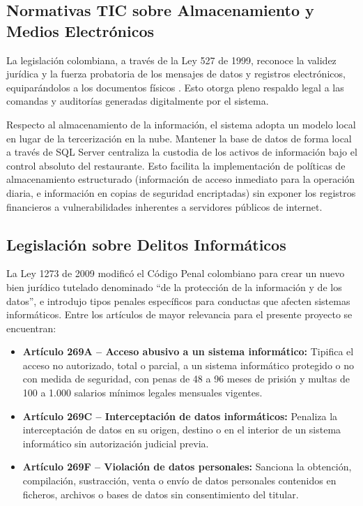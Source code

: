 \subsection{Normativas TIC sobre Almacenamiento y Medios Electrónicos}
La legislación colombiana, a través de la Ley 527 de 1999, reconoce la validez jurídica y la fuerza probatoria de los mensajes de datos y registros electrónicos, equiparándolos a los documentos físicos \cite{ley527}. Esto otorga pleno respaldo legal a las comandas y auditorías generadas digitalmente por el sistema. 

Respecto al almacenamiento de la información, el sistema adopta un modelo local en lugar de la tercerización en la nube. Mantener la base de datos de forma local a través de SQL Server centraliza la custodia de los activos de información bajo el control absoluto del restaurante. Esto facilita la implementación de políticas de almacenamiento estructurado (información de acceso inmediato para la operación diaria, e información en copias de seguridad encriptadas) sin exponer los registros financieros a vulnerabilidades inherentes a servidores públicos de internet.

\subsection{Legislación sobre Delitos Informáticos}
La Ley 1273 de 2009 modificó el Código Penal colombiano para crear un nuevo
bien jurídico tutelado denominado ``de la protección de la información y de
los datos'', e introdujo tipos penales específicos para conductas que afecten
sistemas informáticos. Entre los artículos de mayor relevancia
para el presente proyecto se encuentran:

\begin{itemize}
	\item \textbf{Artículo 269A -- Acceso abusivo a un sistema informático:}
	Tipifica el acceso no autorizado, total o parcial, a un sistema
	informático protegido o no con medida de seguridad, con penas de 48 a
	96 meses de prisión y multas de 100 a 1.000 salarios mínimos legales
	mensuales vigentes.
	\item \textbf{Artículo 269C -- Interceptación de datos informáticos:}
	Penaliza la interceptación de datos en su origen, destino o en el
	interior de un sistema informático sin autorización judicial previa.
	\item \textbf{Artículo 269F -- Violación de datos personales:}
	Sanciona la obtención, compilación, sustracción, venta o envío de datos
	personales contenidos en ficheros, archivos o bases de datos sin
	consentimiento del titular.
\end{itemize}

